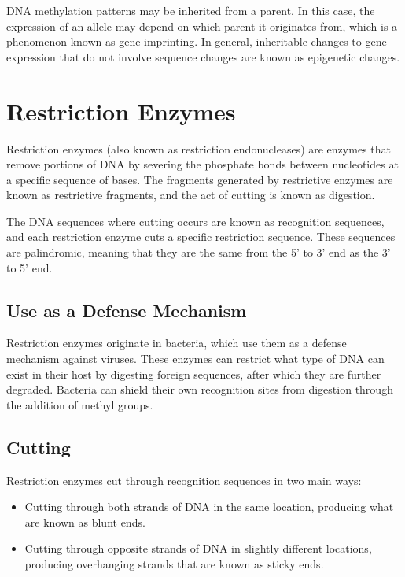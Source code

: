 \documentclass[12pt,titlepage]{article}
\begin{document}
        DNA methylation patterns may be inherited from a parent. In this case, the expression of an allele may depend on which parent it originates from,
        which is a phenomenon known as gene imprinting. In general, inheritable changes to gene expression that do not involve sequence changes are known
        as epigenetic changes.

  \newpage

  \section{Restriction Enzymes}
    Restriction enzymes (also known as restriction endonucleases) are enzymes that remove portions of DNA by severing the phosphate bonds between nucleotides
    at a specific sequence of bases. The fragments generated by restrictive enzymes are known as restrictive fragments, and the act of cutting is known as
    digestion.

    The DNA sequences where cutting occurs are known as recognition sequences, and each restriction enzyme cuts a specific restriction sequence. These
    sequences are palindromic, meaning that they are the same from the 5' to 3' end as the 3' to 5' end.

    \subsection{Use as a Defense Mechanism}
      Restriction enzymes originate in bacteria, which use them as a defense mechanism against viruses. These enzymes can restrict what type of DNA can exist in
      their host by digesting foreign sequences, after which they are further degraded. Bacteria can shield their own recognition sites from digestion through
      the addition of methyl groups.

    \subsection{Cutting}
      Restriction enzymes cut through recognition sequences in two main ways:
      \begin{itemize}
        \item Cutting through both strands of DNA in the same location, producing what are known as blunt ends.
        \item Cutting through opposite strands of DNA in slightly different locations, producing overhanging strands that are known as sticky ends.
      \end{itemize}
\end{document}
